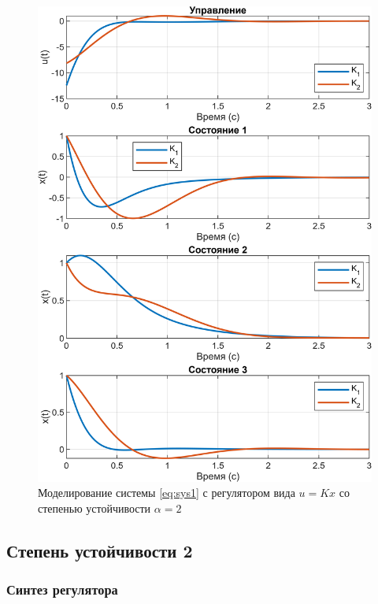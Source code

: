 \begin{figure}[H]
    \centering
    \includegraphics[width=\linewidth]{figs/task10.png}
    \caption{Моделирование системы \eqref{eq:sys1} с регулятором вида $u=Kx$
    со степенью устойчивости $\alpha=2$}
    \label{fig:1k1}
\end{figure}




\subsection{Степень устойчивости 2}

\subsubsection{Синтез регулятора}


